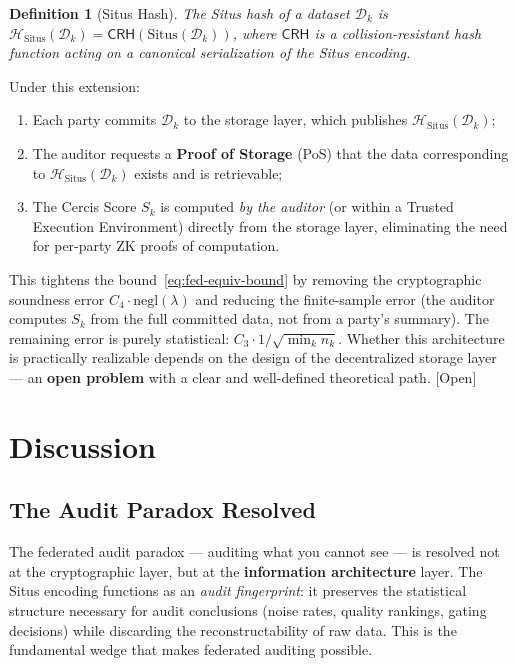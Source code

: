 \documentclass[12pt,a4paper]{article}
\newtheorem{definition}[theorem]{Definition}
\newcommand{\openquest}{\textcolor{red!70!black}{\small\textsf{[Open]}}}
\newcommand{\cD}{\mathcal{D}}
\newcommand{\Situs}{\mathrm{Situs}}
\newcommand{\ZK}{\mathrm{ZK}}
\begin{document}
\begin{definition}[Situs Hash]
The Situs hash of a dataset $\cD_k$ is
$\mathcal{H}_{\Situs}(\cD_k) = \mathsf{CRH}(\Situs(\cD_k))$, where
$\mathsf{CRH}$ is a collision-resistant hash function acting on a
canonical serialization of the Situs encoding.
\end{definition}

Under this extension:
\begin{enumerate}[label=(\roman*)]
    \item Each party commits $\cD_k$ to the storage layer, which publishes
          $\mathcal{H}_{\Situs}(\cD_k)$;
    \item The auditor requests a \textbf{Proof of Storage} (PoS) that the
          data corresponding to $\mathcal{H}_{\Situs}(\cD_k)$ exists and is
          retrievable;
    \item The Cercis Score $S_k$ is computed \emph{by the auditor} (or within
          a Trusted Execution Environment) directly from the storage layer,
          eliminating the need for per-party $\ZK$ proofs of computation.
\end{enumerate}

This tightens the bound~\eqref{eq:fed-equiv-bound} by removing the
cryptographic soundness error $C_4 \cdot \mathrm{negl}(\lambda)$ and
reducing the finite-sample error (the auditor computes $S_k$ from the full
committed data, not from a party's summary).  The remaining error is purely
statistical: $C_3 \cdot 1/\sqrt{\min_k n_k}$.  Whether this architecture is
practically realizable depends on the design of the decentralized storage
layer — an \textbf{open problem} with a clear and well-defined theoretical
path.  \openquest

\section{Discussion}

\subsection{The Audit Paradox Resolved}

The federated audit paradox — auditing what you cannot see — is resolved not
at the cryptographic layer, but at the \textbf{information architecture}
layer.  The Situs encoding functions as an \emph{audit fingerprint}: it
preserves the statistical structure necessary for audit conclusions (noise
rates, quality rankings, gating decisions) while discarding the
reconstructability of raw data.  This is the fundamental wedge that makes
federated auditing possible.
\end{document}
